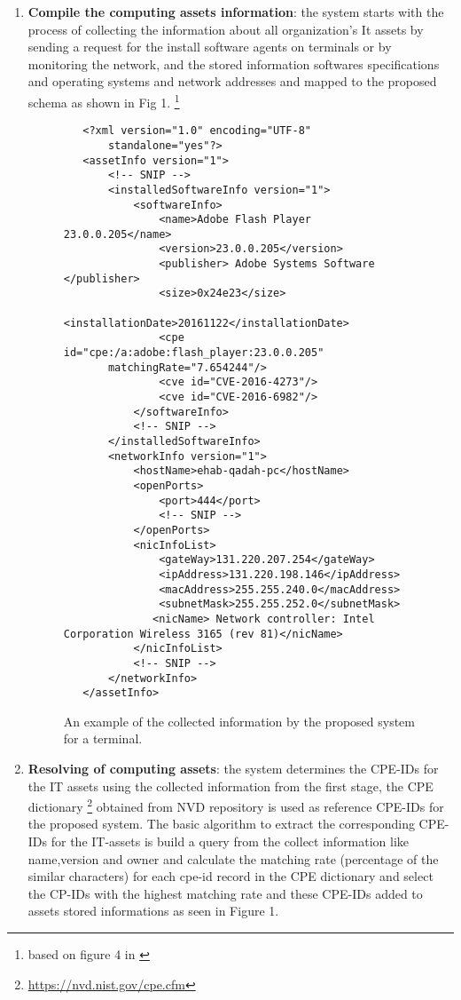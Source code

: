 \documentclass{llncs}
\begin{document}
\begin{enumerate}
 \item \textbf{Compile the computing assets information}: the system starts with the process of collecting the information about all organization's It assets by sending a request for the install software agents on terminals or by monitoring the network, and the stored information softwares specifications and operating systems and network addresses and mapped to the proposed schema as shown in Fig 1.  \footnote{based on figure 4 in \cite{paper1}} 
 
 \begin{figure}
 \centering
   \lstset{language=XML}
    \begin{lstlisting}
   <?xml version="1.0" encoding="UTF-8"
       standalone="yes"?>
   <assetInfo version="1">
       <!-- SNIP -->
       <installedSoftwareInfo version="1">
           <softwareInfo>
               <name>Adobe Flash Player 23.0.0.205</name>
               <version>23.0.0.205</version>
               <publisher> Adobe Systems Software </publisher>
               <size>0x24e23</size>
               <installationDate>20161122</installationDate>
               <cpe id="cpe:/a:adobe:flash_player:23.0.0.205"
       matchingRate="7.654244"/>
               <cve id="CVE-2016-4273"/>
               <cve id="CVE-2016-6982"/>
           </softwareInfo>
           <!-- SNIP -->
       </installedSoftwareInfo>
       <networkInfo version="1">
           <hostName>ehab-qadah-pc</hostName>
           <openPorts>
               <port>444</port>
               <!-- SNIP -->
           </openPorts>
           <nicInfoList>
               <gateWay>131.220.207.254</gateWay>
               <ipAddress>131.220.198.146</ipAddress>
               <macAddress>255.255.240.0</macAddress>
               <subnetMask>255.255.252.0</subnetMask>
              <nicName> Network controller: Intel Corporation Wireless 3165 (rev 81)</nicName>
           </nicInfoList>
           <!-- SNIP -->
       </networkInfo>
   </assetInfo>
    \end{lstlisting}
   \caption{An example of the collected information by the proposed system for  a terminal.}
    \end{figure}
   
   \item \textbf{Resolving of computing assets}: the system determines the CPE-IDs for the IT assets using the collected information from the first stage, the CPE dictionary \footnote{\url{https://nvd.nist.gov/cpe.cfm}} obtained from NVD repository is used as reference CPE-IDs for the proposed system. The basic algorithm to extract the corresponding CPE-IDs for the IT-assets is build a query from the collect information like name,version and owner and calculate the matching rate (percentage of the similar characters) for each cpe-id record in the CPE dictionary and select the CP-IDs with the highest matching rate and these CPE-IDs added to assets stored informations as seen in Figure 1.
   

\end{enumerate}
\end{document}
